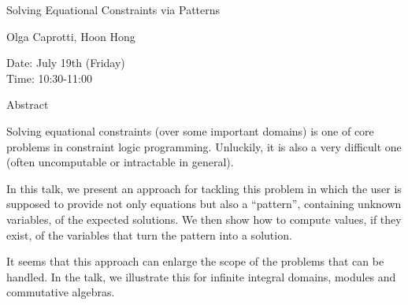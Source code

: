 \begin{center}
\LARGE
Solving Equational Constraints via Patterns

\end{center}

\begin{center}
\Large
Olga Caprotti, Hoon Hong

\end{center}

\noindent
Date:  July 19th (Friday)\\
Time:  10:30-11:00\\

\begin{center}
\large
Abstract
\end{center}

Solving equational constraints (over some important domains) is one of core problems in
constraint logic programming. Unluckily, it is also a very difficult one (often uncomputable or
intractable in general). 

In this talk, we present an approach for tackling this problem in which the user is supposed to
provide not only equations but also a ``pattern'', containing unknown variables, of the expected
solutions. We then show how to compute values, if they exist, of the variables that turn the pattern
into a solution. 

It seems that this approach can enlarge the scope of the problems that can be handled. In the talk,
we illustrate this for infinite integral domains, modules and commutative algebras. 

